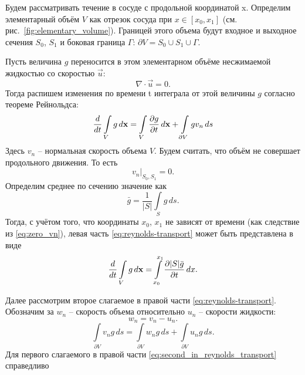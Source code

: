 Будем рассматривать течение в сосуде с продольной координатой \gls{x}.
Определим элементарный объём $V$ как отрезок сосуда при $x\in[x_0, x_1]$ (см. рис.~\ref{fig:elementary_volume}).
Границей этого объема будут входное и выходное сечения $S_0$, $S_1$ и
боковая граница $\Gamma$: $\partial V = S_0 \cup S_1 \cup \Gamma$.

Пусть величина $g$ переносится в этом элементарном объёме несжимаемой
жидкостью со скоростью $\vec u$:
\begin{equation}
\label{eq:divu}
\nabla\cdot \vec u = 0.
\end{equation}
Тогда распишем изменения по времени \gls{t}  интеграла от этой величины $g$ согласно теореме Рейнольдса:
\begin{equation}
\label{eq:reynolds-transport}
\frac{d}{dt}\int\limits_{V}g\,d\boldsymbol{\rm x} = 
\int\limits_{V}\frac{\partial g}{\partial t}\,d\boldsymbol{\rm x} + \int\limits_{\partial V} g v_n \,d s
\end{equation}
Здесь $v_n$ -- нормальная скорость объема $V$.
Будем считать, что объём не совершает продольного движения. То есть
\begin{equation}
\label{eq:zero_vn}
\left.v_n\right|_{S_0, S_1} = 0.
\end{equation}
Определим среднее по сечению значение как
\begin{equation}
\label{eq:average_g}
\bar g = \frac{1}{|S|}\int\limits_S g \, ds.
\end{equation}
Тогда, с учётом того, что координаты $x_0$, $x_1$ не зависят
от времени (как следствие из \cref{eq:zero_vn}), левая часть \cref{eq:reynolds-transport} может быть представлена
в виде
\begin{equation}
\label{eq:left_in_reynolds_transport}
\frac{d}{dt}\int\limits_{V}g\,d\boldsymbol{\rm x} = 
\int\limits_{x_0}^{x_1} \frac{\partial |S| \bar g}{\partial t} \, dx.
\end{equation}

Далее рассмотрим второе слагаемое в правой части \cref{eq:reynolds-transport}.
Обозначим за $w_n$ -- скорость объема относительно $u_n$ -- скорости жидкости:
\begin{equation}
\label{eq:wn_vn_un}
w_n = v_n - u_n.
\end{equation}
\begin{equation}
\label{eq:second_in_reynolds_transport}
\int\limits_{\partial V} v_n g \, ds = 
\int\limits_{\partial V} w_n g \, ds +
\int\limits_{\partial V} u_n g \, ds.
\end{equation}
Для первого слагаемого в правой части \cref{eq:second_in_reynolds_transport} справедливо

